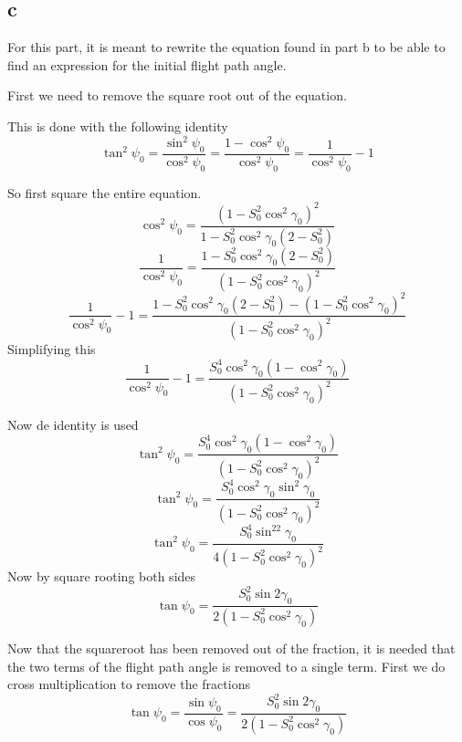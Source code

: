 \subsection*{c}
For this part, it is meant to rewrite the equation found in part b to be able to find an expression for the initial flight path angle.

First we need to remove the square root out of the equation.

This is done with the following identity
\begin{equation}
\tan^2\psi_0=\frac{\sin^2\psi_0}{\cos^2\psi_0}=\frac{1-\cos^2\psi_0}{\cos^2\psi_0}=\frac{1}{\cos^2\psi_0}-1
\end{equation}

So first square the entire equation.
\begin{equation}
\cos^2\psi_0 = \frac{(1-S_0^2\cos^2\gamma_0)^2}{1-S_0^2\cos^2\gamma_0(2-S_0^2)}
\end{equation}
\begin{equation}
\frac{1}{\cos^2\psi_0}=\frac{1-S_0^2\cos^2\gamma_0(2-S_0^2)}{(1-S_0^2\cos^2\gamma_0)^2}
\end{equation}
\begin{equation}
\frac{1}{\cos^2\psi_0}-1=\frac{1-S_0^2\cos^2\gamma_0(2-S_0^2)-(1-S_0^2\cos^2\gamma_0)^2}{(1-S_0^2\cos^2\gamma_0)^2}
\end{equation}
Simplifying this 
\begin{equation}
\frac{1}{\cos^2\psi_0}-1=\frac{S_0^4\cos^2\gamma_0(1-\cos^2\gamma_0)}{(1-S_0^2\cos^2\gamma_0)^2}
\end{equation}

Now de identity is used
\begin{equation}
\tan^2\psi_0=\frac{S_0^4\cos^2\gamma_0(1-\cos^2\gamma_0)}{(1-S_0^2\cos^2\gamma_0)^2}
\end{equation}
\begin{equation}
\tan^2\psi_0=\frac{S_0^4\cos^2\gamma_0\sin^2\gamma_0}{(1-S_0^2\cos^2\gamma_0)^2}
\end{equation}
\begin{equation}
\tan^2\psi_0=\frac{S_0^4\sin^22\gamma_0}{
4(1-S_0^2\cos^2\gamma_0)^2}
\end{equation}
Now by square rooting both sides
\begin{equation}
\tan\psi_0=\frac{S_0^2\sin2\gamma_0}{2(1-S_0^2\cos^2\gamma_0)}
\end{equation}

Now that the squareroot has been removed out of the fraction, it is needed that the two terms of the flight path angle is removed to a single term. First we do cross multiplication to remove the fractions
\begin{equation}
\tan\psi_0=\frac{\sin\psi_0}{\cos\psi_0}=\frac{S_0^2\sin2\gamma_0}{2(1-S_0^2\cos^2\gamma_0)}
\end{equation}

